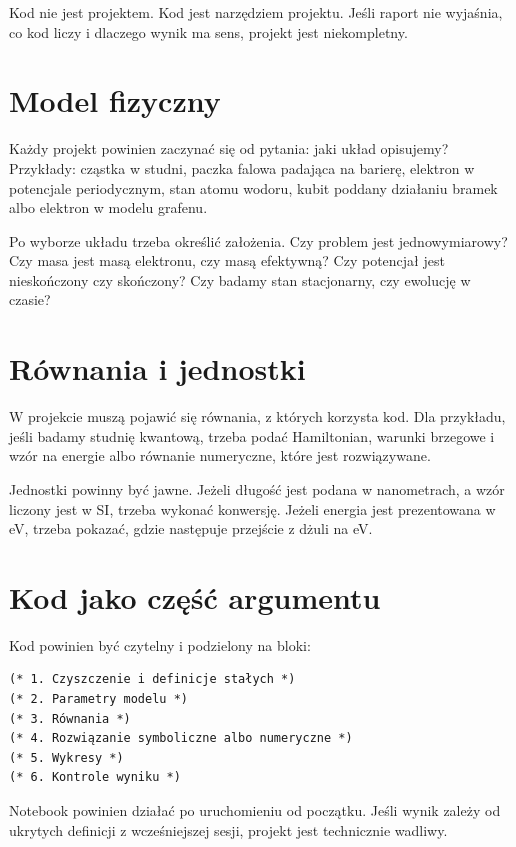\begin{warningbox}
Kod nie jest projektem. Kod jest narzędziem projektu. Jeśli raport nie wyjaśnia,
co kod liczy i dlaczego wynik ma sens, projekt jest niekompletny.
\end{warningbox}

\section{Model fizyczny}

Każdy projekt powinien zaczynać się od pytania: jaki układ opisujemy? Przykłady:
cząstka w studni, paczka falowa padająca na barierę, elektron w potencjale
periodycznym, stan atomu wodoru, kubit poddany działaniu bramek albo elektron w
modelu grafenu.

Po wyborze układu trzeba określić założenia. Czy problem jest jednowymiarowy?
Czy masa jest masą elektronu, czy masą efektywną? Czy potencjał jest nieskończony
czy skończony? Czy badamy stan stacjonarny, czy ewolucję w czasie?

\section{Równania i jednostki}

W projekcie muszą pojawić się równania, z których korzysta kod. Dla przykładu,
jeśli badamy studnię kwantową, trzeba podać Hamiltonian, warunki brzegowe i wzór
na energie albo równanie numeryczne, które jest rozwiązywane.

Jednostki powinny być jawne. Jeżeli długość jest podana w nanometrach, a wzór
liczony jest w SI, trzeba wykonać konwersję. Jeżeli energia jest prezentowana w
eV, trzeba pokazać, gdzie następuje przejście z dżuli na eV.

\section{Kod jako część argumentu}

Kod powinien być czytelny i podzielony na bloki:
\begin{verbatim}
(* 1. Czyszczenie i definicje stałych *)
(* 2. Parametry modelu *)
(* 3. Równania *)
(* 4. Rozwiązanie symboliczne albo numeryczne *)
(* 5. Wykresy *)
(* 6. Kontrole wyniku *)
\end{verbatim}

Notebook powinien działać po uruchomieniu od początku. Jeśli wynik zależy od
ukrytych definicji z wcześniejszej sesji, projekt jest technicznie wadliwy.

